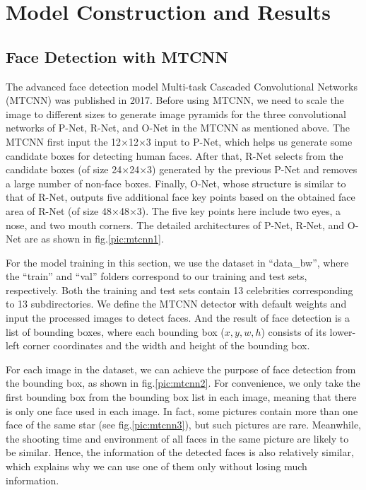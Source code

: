 \section{Model Construction and Results}
\subsection{Face Detection with MTCNN}

The advanced face detection model Multi-task Cascaded Convolutional Networks (MTCNN) \cite{xiang2017joint} was published in 2017.
Before using MTCNN, we need to scale the image to different sizes to generate image pyramids for the three convolutional networks of P-Net, R-Net, and O-Net in the MTCNN as mentioned above. The MTCNN first input the 12×12×3 input to P-Net, which helps us generate some candidate boxes for detecting human faces. After that, R-Net selects from the candidate boxes (of size 24×24×3) generated by the previous P-Net and removes a large number of non-face boxes. Finally, O-Net, whose structure is similar to that of R-Net, outputs five additional face key points based on the obtained face area of R-Net (of size 48×48×3). The five key points here include two eyes, a nose, and two mouth corners. The detailed architectures of P-Net, R-Net, and O-Net are as shown in fig.\ref{pic:mtcnn1}. 

For the model training in this section, we use the dataset in ``data\_bw'', where the ``train'' and ``val'' folders correspond to our training and test sets, respectively. Both the training and test sets contain 13 celebrities corresponding to 13 subdirectories. We define the MTCNN detector with default weights and input the processed images to detect faces. And the result of face detection is a list of bounding boxes, where each bounding box ($x, y, w, h$) consists of its lower-left corner coordinates and the width and height of the bounding box. 

For each image in the dataset, we can achieve the purpose of face detection from the bounding box, as shown in fig.\ref{pic:mtcnn2}.
For convenience, we only take the first bounding box from the bounding box list in each image, meaning that there is only one face used in each image. In fact, some pictures contain more than one face of the same star (see fig.\ref{pic:mtcnn3}), but such pictures are rare. Meanwhile, the shooting time and environment of all faces in the same picture are likely to be similar. Hence, the information of the detected faces is also relatively similar, which explains why we can use one of them only without losing much information. 

